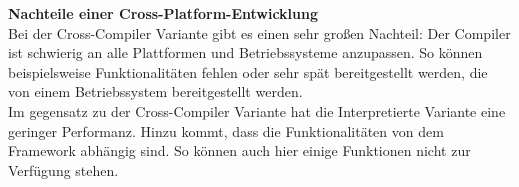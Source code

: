 \documentclass[ngerman]{article}
\begin{document}
    \textbf{Nachteile einer Cross-Platform-Entwicklung}\\
    Bei der Cross-Compiler Variante gibt es einen sehr großen Nachteil: Der Compiler ist schwierig an alle Plattformen und Betriebssysteme anzupassen. So können beispielsweise Funktionalitäten fehlen oder sehr spät bereitgestellt werden, die von einem Betriebssystem bereitgestellt werden.\\
    Im gegensatz zu der Cross-Compiler Variante hat die Interpretierte Variante eine geringer Performanz. Hinzu kommt, dass die Funktionalitäten von dem Framework abhängig sind. So können auch hier einige Funktionen nicht zur Verfügung stehen.\cite{Cross-platform development of smartphone applications: An evaluation of React Native}
\end{document}
